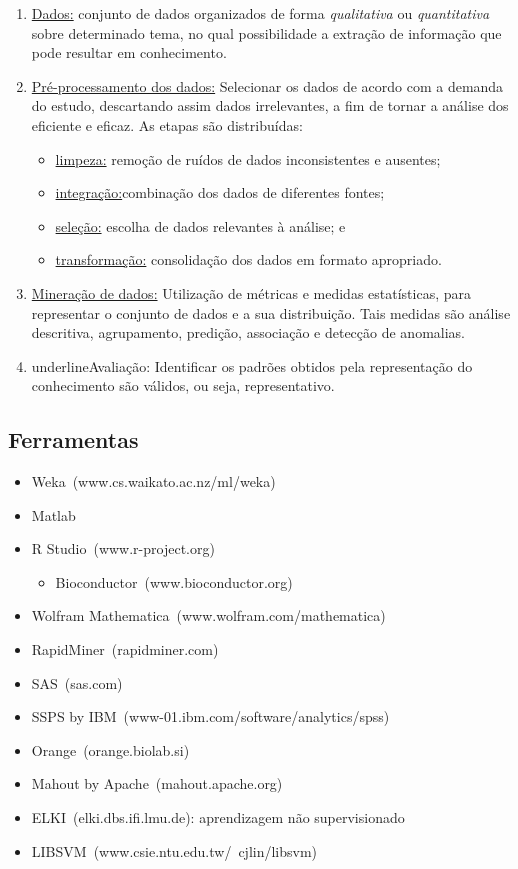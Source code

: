 \begin{enumerate}
	\item \underline{Dados:}
	      conjunto de dados organizados de forma \textit{qualitativa} ou \textit{quantitativa} sobre determinado tema, no qual possibilidade a extração de informação que pode resultar em conhecimento.
	\item \underline{Pré-processamento dos dados:}
	      Selecionar os dados de acordo com a demanda do estudo, descartando assim dados irrelevantes, a fim de tornar a análise dos eficiente e eficaz.
	      As etapas são distribuídas:
	      \begin{itemize}
		      \item \underline{limpeza:} remoção de ruídos de dados inconsistentes e ausentes;
		      \item \underline{integração:}combinação dos dados de diferentes fontes;
		      \item \underline{seleção:} escolha de dados relevantes à análise; e
		      \item \underline{transformação:} consolidação dos dados em formato apropriado.
	      \end{itemize}
	\item \underline{Mineração de dados:}
	      Utilização de métricas e medidas estatísticas, para representar o conjunto de dados e a sua distribuição.
	      Tais medidas são análise descritiva, agrupamento, predição, associação e detecção de anomalias.
	\item underline{Avaliação:}
	      Identificar os padrões obtidos pela representação do conhecimento são válidos, ou seja, representativo.
\end{enumerate}


\subsection{Ferramentas}

\begin{itemize}
	\item Weka~(www.cs.waikato.ac.nz/ml/weka)
	\item Matlab
	\item R Studio~(www.r-project.org)
	      \begin{itemize}
		      \item Bioconductor~(www.bioconductor.org)
	      \end{itemize}
	\item Wolfram Mathematica~(www.wolfram.com/mathematica)
	\item RapidMiner~(rapidminer.com)
	\item SAS~(sas.com)
	\item SSPS by IBM~(www-01.ibm.com/software/analytics/spss)
	\item Orange~(orange.biolab.si)
	\item Mahout by Apache~(mahout.apache.org)
	\item ELKI~(elki.dbs.ifi.lmu.de): aprendizagem não supervisionado
	\item LIBSVM~(www.csie.ntu.edu.tw/~cjlin/libsvm)
\end{itemize}


